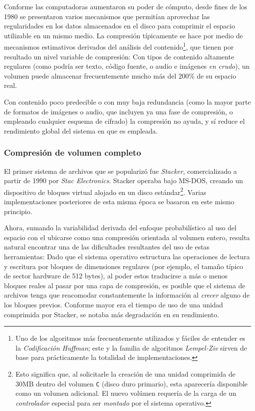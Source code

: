 \documentclass[11pt,fleqn]{book} %
\begin{document}
Conforme las computadoras aumentaron su poder de cómputo, desde fines
de los 1980 se presentaron varios mecanismos que permitían aprovechar
las regularidades en los datos almacenados en el disco para comprimir
el espacio utilizable en un mismo medio. La compresión típicamente se
hace por medio de mecanismos estimativos derivados del análisis del
contenido\footnote{Uno de los algoritmos más frecuentemente utilizados y
fáciles de entender es la \emph{Codificación Huffman}; este y la familia de
algoritmos \emph{Lempel-Ziv} sirven de base para prácticamente la totalidad
de implementaciones. }, que tienen por resultado un nivel variable de
compresión: Con tipos de contenido altamente regulares (como podría
ser texto, código fuente, o audio e imágenes \emph{en crudo}), un volumen
puede almacenar frecuentemente mucho más del 200\% de su espacio real.

Con contenido poco predecible o con muy baja redundancia (como la
mayor parte de formatos de imágenes o audio, que incluyen ya una fase
de compresión, o empleando cualquier esquema de cifrado) la compresión
no ayuda, y sí reduce el rendimiento global del sistema en que es
empleada.
\subsubsection{Compresión de volumen completo}
\label{sec-7-1-5-1}


El primer sistema de archivos que se popularizó fue \emph{Stacker},
comercializado a partir de 1990 por \emph{Stac Electronics}. Stacker
operaba bajo MS-DOS, creando un dispositivo de bloques virtual alojado
en un disco estándar\footnote{Esto significa que, al solicitarle la
creación de una unidad comprimida de 30MB dentro del volumen \texttt{C}
(disco duro primario), esta aparecería disponible como un volumen
adicional. El nuevo volúmen requería de la carga de un \emph{controlador}
especial para ser \emph{montado} por el sistema operativo. }. Varias
implementaciones posteriores de esta misma época se basaron en este
mismo principio.

Ahora, sumando la variabilidad derivada del enfoque probabilístico
al uso del espacio con el ubicarse como una compresión orientada al
volumen entero, resulta natural encontrar una de las dificultades
resultantes del uso de estas herramientas: Dado que el sistema
operativo estructura las operaciones de lectura y escritura por
bloques de dimensiones regulares (por ejemplo, el
tamaño típico de sector hardware de 512 bytes), al poder estos traducirse a más
o menos bloques reales al pasar por una capa de compresión, es posible
que el sistema de archivos tenga que reacomodar constantemente la
información al \emph{crecer} alguno de los bloques previos.  Conforme mayor
era el tiempo de uso de una unidad comprimida por Stacker, se notaba
más degradación en su rendimiento.
\end{document}
